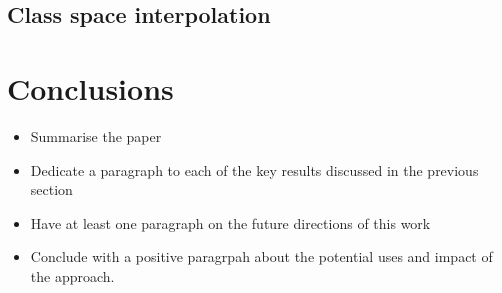 \documentclass[12pt]{iopart}
\begin{document}
\subsection{Class space interpolation}


\section{Conclusions}

\begin{itemize}
\item Summarise the paper
\item Dedicate a paragraph to each of the key results discussed in the previous
section
\item Have at least one paragraph on the future directions of this work
\item Conclude with a positive paragrpah about the potential uses and impact of
the approach.
\end{itemize}

\clearpage

\appendix
\end{document}
